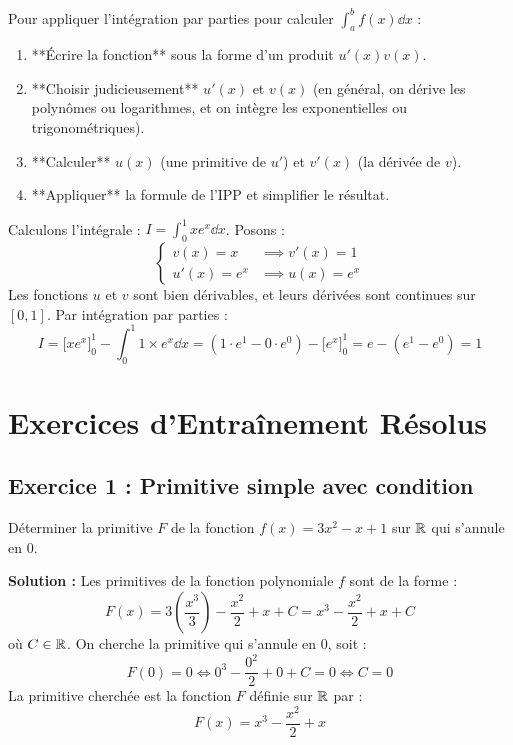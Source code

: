 \begin{methode}
Pour appliquer l'intégration par parties pour calculer $\int_a^b f(x) \dd x$ :
\begin{enumerate}
    \item **Écrire la fonction** sous la forme d'un produit $u'(x)v(x)$.
    \item **Choisir judicieusement** $u'(x)$ et $v(x)$ (en général, on dérive les polynômes ou logarithmes, et on intègre les exponentielles ou trigonométriques).
    \item **Calculer** $u(x)$ (une primitive de $u'$) et $v'(x)$ (la dérivée de $v$).
    \item **Appliquer** la formule de l'IPP et simplifier le résultat.
\end{enumerate}
\end{methode}

\begin{exemple}
Calculons l'intégrale : $I = \int_0^1 x e^x \dd x$.
Posons :
\[
\begin{cases}
v(x) = x & \implies v'(x) = 1 \\
u'(x) = e^x & \implies u(x) = e^x
\end{cases}
\]
Les fonctions $u$ et $v$ sont bien dérivables, et leurs dérivées sont continues sur $[0,1]$.
Par intégration par parties :
\[
I = \Big[ x e^x \Big]_0^1 - \int_0^1 1 \times e^x \dd x = (1 \cdot e^1 - 0 \cdot e^0) - \Big[ e^x \Big]_0^1 = e - (e^1 - e^0) = 1
\]
\end{exemple}

\section{Exercices d'Entraînement Résolus}

\subsection*{Exercice 1 : Primitive simple avec condition}
Déterminer la primitive $F$ de la fonction $f(x) = 3x^2 - x + 1$ sur $\mathbb{R}$ qui s'annule en 0.

\textbf{Solution :}
Les primitives de la fonction polynomiale $f$ sont de la forme :
\[
F(x) = 3\left(\frac{x^3}{3}\right) - \frac{x^2}{2} + x + C = x^3 - \frac{x^2}{2} + x + C
\]
où $C \in \mathbb{R}$.
On cherche la primitive qui s'annule en 0, soit :
\[
F(0) = 0 \iff 0^3 - \frac{0^2}{2} + 0 + C = 0 \iff C = 0
\]
La primitive cherchée est la fonction $F$ définie sur $\mathbb{R}$ par :
\[
F(x) = x^3 - \frac{x^2}{2} + x
\]

